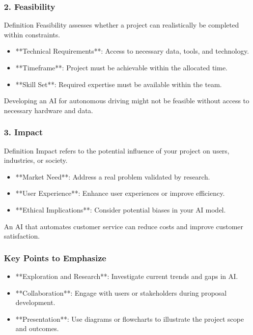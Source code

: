 \documentclass[aspectratio=169]{beamer}
\begin{document}
\begin{frame}[fragile]
    \frametitle{2. Feasibility}
    \begin{block}{Definition}
        Feasibility assesses whether a project can realistically be completed within constraints.
    \end{block}
    \begin{itemize}
        \item **Technical Requirements**: Access to necessary data, tools, and technology.
        \item **Timeframe**: Project must be achievable within the allocated time.
        \item **Skill Set**: Required expertise must be available within the team.
    \end{itemize}
    \begin{example}
        Developing an AI for autonomous driving might not be feasible without access to necessary hardware and data.
    \end{example}
\end{frame}

\begin{frame}[fragile]
    \frametitle{3. Impact}
    \begin{block}{Definition}
        Impact refers to the potential influence of your project on users, industries, or society.
    \end{block}
    \begin{itemize}
        \item **Market Need**: Address a real problem validated by research.
        \item **User Experience**: Enhance user experiences or improve efficiency.
        \item **Ethical Implications**: Consider potential biases in your AI model.
    \end{itemize}
    \begin{example}
        An AI that automates customer service can reduce costs and improve customer satisfaction.
    \end{example}
\end{frame}

\begin{frame}[fragile]
    \frametitle{Key Points to Emphasize}
    \begin{itemize}
        \item **Exploration and Research**: Investigate current trends and gaps in AI.
        \item **Collaboration**: Engage with users or stakeholders during proposal development.
        \item **Presentation**: Use diagrams or flowcharts to illustrate the project scope and outcomes.
    \end{itemize}
\end{frame}
\end{document}
